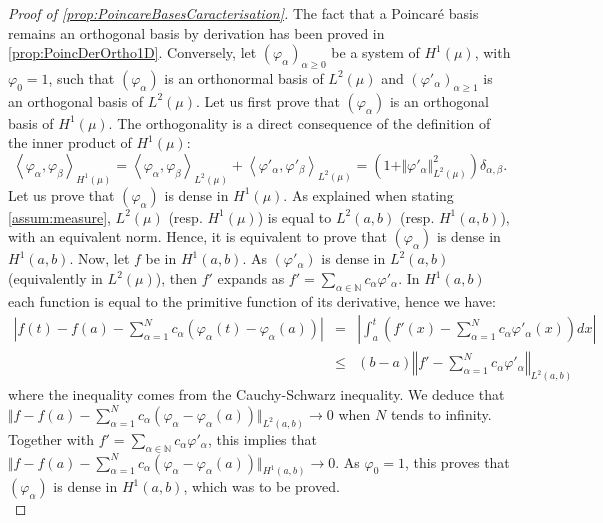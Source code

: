 \documentclass[a4paper,11pt]{article}
\newcommand{\Nn}{\mathbb{N}}
\newcommand{\innprod}[2]{\left\langle #1, #2 \right\rangle}
\theoremstyle{definition}
\theoremstyle{remark}
\theoremstyle{theorem}
\begin{document}
\begin{proof}[Proof of \cref{prop:PoincareBasesCaracterisation}]
	The fact that a Poincar\'e basis remains an orthogonal basis by derivation has been proved in \cref{prop:PoincDerOrtho1D}.
	Conversely, let $(\varphi_\alpha)_{\alpha \geq 0}$ be a system of $H^1(\mu)$, with $\varphi_0 = 1$, such that $(\varphi_\alpha)$ is an orthonormal basis of $L^2(\mu)$ and $(\varphi'_\alpha)_{\alpha \geq 1}$ is an orthogonal basis of $L^2(\mu)$. 
	Let us first prove that $(\varphi_\alpha)$ is an orthogonal basis of $H^1(\mu)$. The orthogonality is a direct consequence of the definition of the inner product of $H^1(\mu)$:
	\begin{equation*}
	\innprod{ \varphi_\alpha}{ \varphi_\beta }_{H^1(\mu)} 
	= \innprod{ \varphi_\alpha}{\varphi_\beta }_{L^2(\mu)}
	+ \innprod{ \varphi'_\alpha}{ \varphi'_\beta }_{L^2(\mu)} 
	= (1 + \Vert \varphi'_\alpha \Vert_{L^2(\mu)}^2) \delta_{\alpha, \beta}.
	\end{equation*}
	Let us prove that $(\varphi_\alpha)$ is dense in $H^1(\mu)$. As explained when stating \cref{assum:measure}, $L^2(\mu)$ (resp. $H^1(\mu)$) is equal to $L^2(a, b)$ (resp. $H^1(a, b)$), with an equivalent norm. Hence, it is equivalent to prove that $(\varphi_\alpha)$ is dense in $H^1(a,b)$. Now, let $f$ be in $H^1(a, b)$. As $(\varphi'_\alpha)$ is dense in $L^2(a, b)$ (equivalently in $L^2(\mu)$), then $f'$ expands as
	$f' = \sum_{\alpha \in \Nn} c_\alpha \varphi'_\alpha$.
	In $H^1(a,b)$ each function is equal to the primitive function of its derivative, hence we have: 
	\begin{eqnarray*}
		\left \vert f(t) - f(a) - \sum_{\alpha=1}^N c_\alpha (\varphi_\alpha(t) - \varphi_\alpha(a)) \right \vert 
		& = & \left \vert \int_a^t \left( f'(x) - \sum_{\alpha=1}^N c_\alpha \varphi'_\alpha(x) \right) dx \right \vert \\
		& \leq & (b - a) \left \Vert f' - \sum_{\alpha=1}^N c_\alpha \varphi'_\alpha \right \Vert_{L^2(a, b)} 
	\end{eqnarray*}
	where the inequality comes from the Cauchy-Schwarz inequality.
	We deduce that 
	$\Vert f - f(a) - \sum_{\alpha = 1}^N c_\alpha (\varphi_\alpha - \varphi_\alpha(a)) \Vert_{L^2(a, b)} \to 0$ when $N$ tends to infinity. Together with $f' = \sum_{\alpha \in \Nn} c_\alpha \varphi'_\alpha$, this implies that $\Vert f - f(a) - \sum_{\alpha = 1}^N c_\alpha (\varphi_\alpha - \varphi_\alpha(a)) \Vert_{H^1(a, b)} \to 0$. As $\varphi_0 = 1$, this proves that $(\varphi_\alpha)$ is dense in $H^1(a,b)$, which was to be proved.\\

\end{proof}
\end{document}
